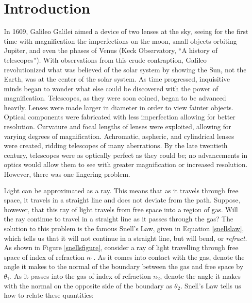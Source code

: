 


\chapter{Introduction}
In 1609, Galileo Galilei aimed a device of two lenses at the sky, seeing for the first time with magnification the imperfections on the moon, small objects orbiting Jupiter, and even the phases of Venus (Keck Observatory, ``A history of telescopes''). With observations from this crude contraption, Galileo revolutionized what was believed of the solar system by showing the Sun, not the Earth, was at the center of the solar system. As time progressed, inquisitive minds began to wonder what else could be discovered with the power of magnification. Telescopes, as they were soon coined, began to be advanced heavily. Lenses were made larger in diameter in order to view fainter objects. Optical components were fabricated with less imperfection allowing for better resolution. Curvature and focal lengths of lenses were exploited, allowing for varying degrees of magnification. Achromatic, aspheric, and cylindrical lenses were created, ridding telescopes of many aberrations. By the late twentieth century, telescopes were as optically perfect as they could be; no advancements in optics would allow them to see with greater magnification or increased resolution. However, there was one lingering problem.

Light can be approximated as a ray. This means that as it travels through free space, it travels in a straight line and does not deviate from the path. Suppose, however, that this ray of light travels from free space into a region of gas. Will the ray continue to travel in a straight line as it passes through the gas? The solution to this problem is the famous Snell's Law, given in Equation \ref{snellslaw}, which tells us that it will not continue in a straight line, but will bend, or \textit{refract}. As shown in Figure \ref{snellsfigure}, consider a ray of light travelling through free space of index of refraction $n_1$. As it comes into contact with the gas, denote the angle it makes to the normal of the boundary between the gas and free space by $\theta_1$. As it passes into the gas of index of refraction $n_2$, denote the angle it makes with the normal on the opposite side of the boundary as $\theta_2$. Snell's Law tells us how to relate these quantities:

